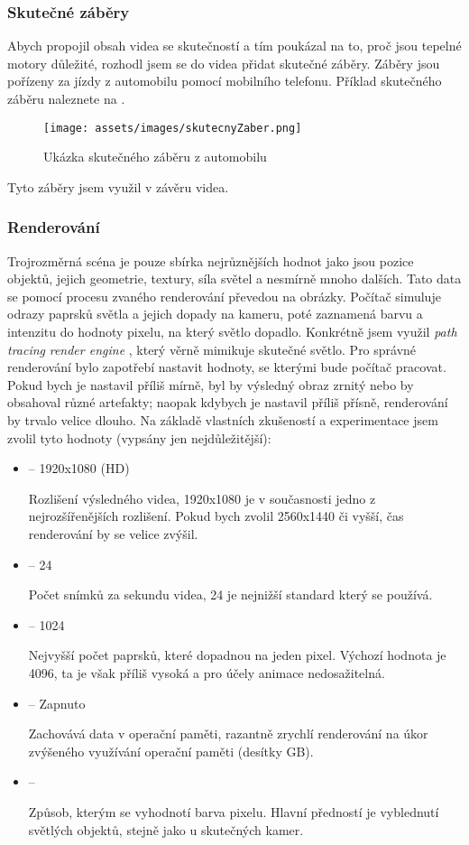 \subsubsection{Skutečné záběry}
{Abych propojil obsah videa se skutečností a tím poukázal na to, proč jsou tepelné motory důležité, rozhodl jsem se do videa přidat skutečné záběry. Záběry jsou pořízeny za jízdy z automobilu pomocí mobilního telefonu.}\odst
{Příklad skutečného záběru naleznete na .}
\begin{figure}[H]
    \centering
    \texttt{[image: assets/images/skutecnyZaber.png]}
    \caption{Ukázka skutečného záběru z automobilu \jaFoto}
    \label{obr:skutecnyZaber}
\end{figure}
{Tyto záběry jsem využil v závěru videa.}
\newpage
\subsubsection{Renderování}\label{sc:renderovani}
{Trojrozměrná scéna je pouze sbírka nejrůznějších hodnot jako jsou pozice objektů, jejich geometrie, textury, síla světel a nesmírně mnoho dalších. Tato data se pomocí procesu zvaného renderování převedou na obrázky. Počítač simuluje odrazy paprsků světla a jejich dopady na kameru, poté zaznamená barvu a intenzitu do hodnoty pixelu, na který světlo dopadlo. Konkrétně jsem využil \textit{path tracing} \textit{render engine} , který věrně mimikuje skutečné světlo.}\odst
{Pro správné renderování bylo zapotřebí nastavit hodnoty, se kterými bude počítač pracovat. Pokud bych je nastavil příliš mírně, byl by výsledný obraz zrnitý nebo by obsahoval různé artefakty; naopak kdybych je nastavil příliš přísně, renderování by trvalo velice dlouho. Na základě vlastních zkušeností a experimentace jsem zvolil tyto hodnoty (vypsány jen nejdůležitější): }
\begin{itemize}
    \item { -- 1920x1080 (HD)}\par
        {Rozlišení výsledného videa, 1920x1080 je v současnosti jedno z nejrozšířenějších rozlišení. Pokud bych zvolil 2560x1440 či vyšší, čas renderování by se velice zvýšil.}
    \item { -- 24}\par
        {Počet snímků za sekundu videa, 24 je nejnižší standard který se používá.}
    \item { -- 1024}\par
        {Nejvyšší počet paprsků, které dopadnou na jeden pixel. Výchozí hodnota je 4096, ta je však příliš vysoká a pro účely animace nedosažitelná.}
    \item { -- Zapnuto}\par
        {Zachovává data v operační paměti, razantně zrychlí renderování na úkor zvýšeného využívání operační paměti (desítky GB).}
    \item { -- }\par
        {Způsob, kterým se vyhodnotí barva pixelu. Hlavní předností  je vyblednutí světlých objektů, stejně jako u skutečných kamer.}
\end{itemize}
